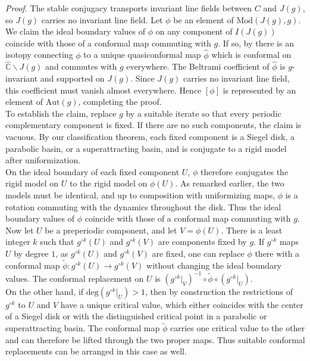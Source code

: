 \documentclass[11pt,a4paper]{article}
\begin{document}
   \textit{Proof.} The stable conjugacy transports invariant line fields between $C$ and $J(g)$, so $J(g)$ carries no invariant line field. Let $\phi$ be an element of $\text{Mod}(J(g), g)$. We claim the ideal boundary values of $\phi$ on any component of $I(J(g))$ coincide with those of a conformal map commuting with $g$. If so, by  there is an isotopy connecting $\phi$ to a unique quasiconformal map $\hat{\phi}$ which is conformal on $\hat{\mathbb{C}}\backslash J(g)$ and commutes with $g$ everywhere. The Beltrami coefficient of $\hat{\phi}$ is $g$-invariant and supported on $J(g)$. Since $J(g)$ carries no invariant line field, this coefficient must vanish almost everywhere. Hence $[\phi]$ is represented by an element of $\text{Aut}(g)$, completing the proof.\\ To establish the claim, replace $g$ by a suitable iterate so that every periodic complementary component is fixed. If there are no such components, the claim is vacuous. By our classification theorem, each fixed component is a Siegel disk, a parabolic basin, or a superattracting basin, and is conjugate to a rigid model after uniformization. \\
   On the ideal boundary of each fixed component $U$, $\phi$ therefore conjugates the rigid model on $U$ to the rigid model on $\phi(U)$. As remarked earlier, the two models must be identical, and up to composition with uniformizing maps, $\phi$ is a rotation commuting with the dynamics throughout the disk. Thus the ideal boundary values of $\phi$ coincide with those of a conformal map commuting with $g$.\\
   Now let $U$ be a preperiodic component, and let $V = \phi(U)$. There is a least integer $k$ such that $g^{\circ k}(U)$ and $g^{\circ k}(V)$ are components fixed by $g$. If $g^{\circ k}$ maps $U$ by degree $1$, as $g^{\circ k}(U)$ and $g^{\circ k}(V)$ are fixed, one can replace $\phi$ there with a conformal map $\tilde{\phi}:g^{\circ k}(U)\rightarrow g^{\circ k}(V)$ without changing the ideal boundary values. The conformal replacement on $U$ is $(g^{\circ k}\big|_V)^{-1}\circ\tilde{\phi}\circ(g^{\circ k}\big|_U)$.\\
   On the other hand, if $\text{deg}(g^{\circ k}\big|_U)>1$, then by construction the restrictions of $g^{\circ k}$ to $U$ and $V$ have a unique critical value, which either coincides with the center of a Siegel disk or with the distinguished critical point in a parabolic or superattracting basin. The conformal map $\tilde{\phi}$ carries one critical value to the other and can therefore be lifted through the two proper maps. Thus suitable conformal replacements can be arranged in this case as well.
\end{document}
